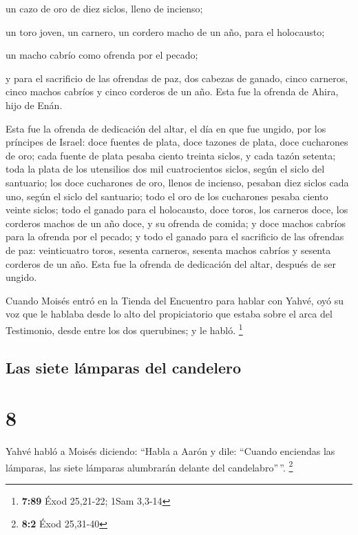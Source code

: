  un cazo de oro de diez siclos, lleno de incienso;

 un toro joven, un carnero, un cordero macho de un año,
para el holocausto;

 un macho cabrío como ofrenda por el pecado;

 y para el sacrificio de las ofrendas de paz, dos cabezas
de ganado, cinco carneros, cinco machos cabríos y cinco corderos de un
año. Esta fue la ofrenda de Ahira, hijo de Enán.

 Esta fue la ofrenda de dedicación del altar, el día en
que fue ungido, por los príncipes de Israel: doce fuentes de plata, doce
tazones de plata, doce cucharones de oro;  cada fuente de
plata pesaba ciento treinta siclos, y cada tazón setenta; toda la plata
de los utensilios dos mil cuatrocientos siclos, según el siclo del
santuario;  los doce cucharones de oro, llenos de
incienso, pesaban diez siclos cada uno, según el siclo del santuario;
todo el oro de los cucharones pesaba ciento veinte siclos;
 todo el ganado para el holocausto, doce toros, los
carneros doce, los corderos machos de un año doce, y su ofrenda de
comida; y doce machos cabríos para la ofrenda por el pecado;
 y todo el ganado para el sacrificio de las ofrendas de
paz: veinticuatro toros, sesenta carneros, sesenta machos cabríos y
sesenta corderos de un año. Esta fue la ofrenda de dedicación del altar,
después de ser ungido.

 Cuando Moisés entró en la Tienda del Encuentro para
hablar con Yahvé, oyó su voz que le hablaba desde lo alto del
propiciatorio que estaba sobre el arca del Testimonio, desde entre los
dos querubines; y le habló. \footnote{\textbf{7:89} Éxod 25,21-22; 1Sam
  3,3-14}

\hypertarget{las-siete-luxe1mparas-del-candelero}{%
\subsection{Las siete lámparas del
candelero}\label{las-siete-luxe1mparas-del-candelero}}

\hypertarget{section-7}{%
\section{8}\label{section-7}}

 Yahvé habló a Moisés diciendo:  ``Habla a
Aarón y dile: ``Cuando enciendas las lámparas, las siete lámparas
alumbrarán delante del candelabro''\,''. \footnote{\textbf{8:2} Éxod
  25,31-40}

